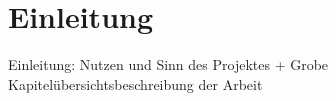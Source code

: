 \section{Einleitung}
Einleitung: Nutzen und Sinn des Projektes + Grobe Kapitelübersichtsbeschreibung der Arbeit